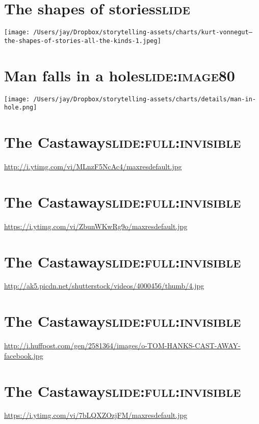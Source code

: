 \documentclass[12pt]{article}
\begin{document}
\section[The \textbf{shapes} of \textbf{stories}]{The \textbf{shapes} of \textbf{stories}\hfill{}\textsc{slide}}
\label{sec:org35d3e70}
\begin{center}
\texttt{[image: /Users/jay/Dropbox/storytelling-assets/charts/kurt-vonnegut--the-shapes-of-stories-all-the-kinds-1.jpeg]}
\end{center}

\section[Man falls in a hole]{Man falls in a hole\hfill{}\textsc{slide:image80}}
\label{sec:orge3338a7}
\begin{center}
\texttt{[image: /Users/jay/Dropbox/storytelling-assets/charts/details/man-in-hole.png]}
\end{center}

\section[The Castaway]{The Castaway\hfill{}\textsc{slide:full:invisible}}
\label{sec:orgcd8c77c}
\url{http://i.ytimg.com/vi/MLnzF5NcAc4/maxresdefault.jpg}

\section[The Castaway]{The Castaway\hfill{}\textsc{slide:full:invisible}}
\label{sec:org1f5f170}
\url{https://i.ytimg.com/vi/ZbunWKwRg9o/maxresdefault.jpg}

\section[The Castaway]{The Castaway\hfill{}\textsc{slide:full:invisible}}
\label{sec:orgbdd21c7}
\url{http://ak5.picdn.net/shutterstock/videos/4000456/thumb/4.jpg}

\section[The Castaway]{The Castaway\hfill{}\textsc{slide:full:invisible}}
\label{sec:org0583d6f}
\url{http://i.huffpost.com/gen/2581364/images/o-TOM-HANKS-CAST-AWAY-facebook.jpg}

\section[The Castaway]{The Castaway\hfill{}\textsc{slide:full:invisible}}
\label{sec:org7e1b8db}
\url{https://i.ytimg.com/vi/7bLQXZOzjFM/maxresdefault.jpg}
\end{document}
